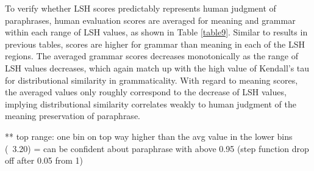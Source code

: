\documentclass[11pt]{article}
\begin{document}
To verify whether LSH scores predictably represents human judgment of paraphrases, human evaluation scores are averaged for meaning and grammar within each range of LSH values, as shown in Table \ref{table9}. Similar to results in previous tables, scores are higher for grammar than meaning in each of the LSH regions. The averaged grammar scores decreases monotonically as the range of LSH values decreases, which again match up with the high value of Kendall's tau for distributional similarity in grammaticality. With regard to meaning scores, the averaged values only roughly correspond to the decrease of LSH values, implying distributional similarity correlates weakly to human judgment of the meaning preservation of paraphrase. 

** top range: one bin on top way higher than the avg value in the lower bins (~3.20) = can be confident about paraphrase with above 0.95
(step function drop off after 0.05 from 1)
\end{document}
